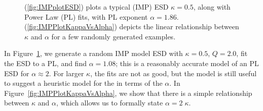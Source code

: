 \begin{figure}[ht]
    \centering
    \caption{
      (\ref{fig:IMPplotESD}) plots a typical \InverseMP (IMP) ESD  $\kappa=0.5$,  along with Power Law (PL) fits, with PL exponent $\alpha=1.86$.
      (\ref{fig:IMPPlotKappaVsAlpha}) depicts the linear relationship between $\kappa$ and $\alpha$ for a few randomly generated examples.
    }
  \label{fig:IMPplots}                                                                                                      
\end{figure}   

In Figure~\ref{fig:IMPplots}, we generate a random IMP model ESD with $\kappa=0.5$, $Q=2.0$, fit the ESD
to a PL, and find $\alpha=1.08$; this is a reasonably accurate model of an PL ESD for $\alpha\approx 2$.
For larger $\kappa$, the fits are not as good, but the model is still useful to suggest a heuristic model for the
\LayerQuality in terms of the \HTSR $\alpha$.
In Figure~\ref{fig:IMPPlotKappaVsAlpha}, we show that there is a simple relationship between $\kappa$ and $\alpha$,
which allows us to formally state $\alpha=2\;\kappa$.

